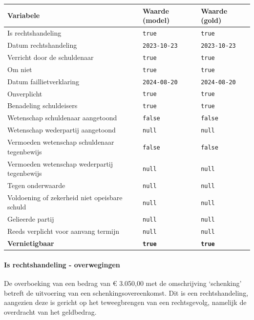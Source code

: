 \documentclass[
  dutch,
  a4paper,
]{article}
\begin{document}
\begin{center}
\small
\begin{tabular}{@{}p{7.4cm}p{2.6cm}p{2.6cm}@{}}
\toprule
Variabele & Waarde (model) & Waarde (gold) \\
\midrule
Is rechtshandeling & \texttt{true} & \texttt{true} \\
Datum rechtshandeling & \texttt{2023-10-23} & \texttt{2023-10-23} \\
Verricht door de schuldenaar & \texttt{true} & \texttt{true} \\
Om niet & \texttt{true} & \texttt{true} \\
Datum faillietverklaring & \texttt{2024-08-20} & \texttt{2024-08-20} \\
Onverplicht & \texttt{true} & \texttt{true} \\
Benadeling schuldeisers & \texttt{true} & \texttt{true} \\
Wetenschap schuldenaar aangetoond & \texttt{false} & \texttt{false} \\
Wetenschap wederpartij aangetoond & \texttt{null} & \texttt{null} \\
Vermoeden wetenschap schuldenaar tegenbewijs & \texttt{false} & \texttt{false} \\
Vermoeden wetenschap wederpartij tegenbewijs & \texttt{null} & \texttt{null} \\
Tegen onderwaarde & \texttt{null} & \texttt{null} \\
Voldoening of zekerheid niet opeisbare schuld & \texttt{null} & \texttt{null} \\
Gelieerde partij & \texttt{null} & \texttt{null} \\
Reeds verplicht voor aanvang termijn & \texttt{null} & \texttt{null} \\
\textbf{Vernietigbaar} & \textbf{\texttt{true}} & \textbf{\texttt{true}} \\
\bottomrule
\end{tabular}
\end{center}

\paragraph{Is rechtshandeling - overwegingen}\label{is-rechtshandeling---overwegingen-29}

De overboeking van een bedrag van € 3.050,00 met de omschrijving `schenking' betreft de uitvoering van een schenkingsovereenkomst. Dit is een rechtshandeling, aangezien deze is gericht op het teweegbrengen van een rechtsgevolg, namelijk de overdracht van het geldbedrag.
\end{document}
